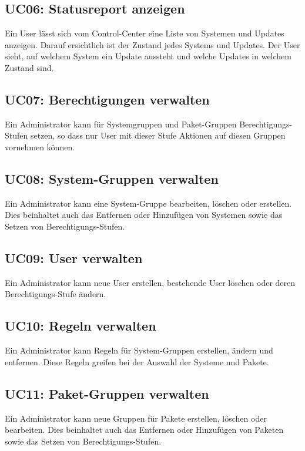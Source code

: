 \subsection*{UC06: Statusreport anzeigen}
\label{sec:uc_06}

Ein User lässt sich vom Control-Center eine Liste von Systemen und Updates anzeigen. Darauf ersichtlich ist der Zustand jedes Systems und Updates. Der User sieht, auf welchem System ein Update aussteht und welche Updates in welchem Zustand sind.

\subsection*{UC07: Berechtigungen verwalten}
\label{sec:uc_07}

Ein Administrator kann für Systemgruppen und Paket-Gruppen Berechtigungs-Stufen setzen, so dass nur User mit dieser Stufe Aktionen auf diesen Gruppen vornehmen können.

\subsection*{UC08: System-Gruppen verwalten}
\label{sec:uc_08}

Ein Administrator kann eine System-Gruppe bearbeiten, löschen oder erstellen. Dies beinhaltet auch das Entfernen oder Hinzufügen von Systemen sowie das Setzen von Berechtigungs-Stufen.

\subsection*{UC09: User verwalten}
\label{sec:uc_09}

Ein Administrator kann neue User erstellen, bestehende User löschen oder deren Berechtigungs-Stufe ändern.

\subsection*{UC10: Regeln verwalten}
\label{sec:uc_10}

Ein Administrator kann Regeln für System-Gruppen erstellen, ändern und entfernen. Diese Regeln greifen bei der Auswahl der Systeme und Pakete.

\subsection*{UC11: Paket-Gruppen verwalten}
\label{sec:uc_11}

Ein Administrator kann neue Gruppen für Pakete erstellen, löschen oder bearbeiten. Dies beinhaltet auch das Entfernen oder Hinzufügen von Paketen sowie das Setzen von Berechtigungs-Stufen.
